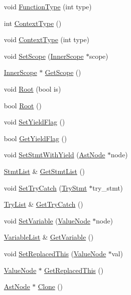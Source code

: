 \begin{DoxyCompactItemize}
\item 
void \hyperlink{classmocha_1_1_function_aeb8391e38eb2842ac1619522719c78af}{FunctionType} (int type)
\item 
int \hyperlink{classmocha_1_1_function_a2fa7ea873cb45ac4f02de44e3cbdf30b}{ContextType} ()
\item 
void \hyperlink{classmocha_1_1_function_af1f79f5424032a6ea0e2fd9b12f589ec}{ContextType} (int type)
\item 
void \hyperlink{classmocha_1_1_function_a9f5cfd13987ac0c4b6840801968afdc8}{SetScope} (\hyperlink{classmocha_1_1_inner_scope}{InnerScope} $\ast$scope)
\item 
\hyperlink{classmocha_1_1_inner_scope}{InnerScope} $\ast$ \hyperlink{classmocha_1_1_function_af8b7fbeeff670593b99208b4b160b50f}{GetScope} ()
\item 
void \hyperlink{classmocha_1_1_function_a4aaeba040456a899caf277cf25f7e236}{Root} (bool is)
\item 
bool \hyperlink{classmocha_1_1_function_abd3776ad2009b24328b3731c6d608ab3}{Root} ()
\item 
void \hyperlink{classmocha_1_1_function_ad71400eb14351910ac6d1c576413fc46}{SetYieldFlag} ()
\item 
bool \hyperlink{classmocha_1_1_function_ac56735e4aac25be688ac143f946aab02}{GetYieldFlag} ()
\item 
void \hyperlink{classmocha_1_1_function_a7262956db2bf8fa1d4e043709a3c0d13}{SetStmtWithYield} (\hyperlink{classmocha_1_1_ast_node}{AstNode} $\ast$node)
\item 
\hyperlink{classmocha_1_1_function_a5c4a48ede908b355b4f13a8f1d585707}{StmtList} \& \hyperlink{classmocha_1_1_function_a7761b50339b11f21c87e1ab52f6fa868}{GetStmtList} ()
\item 
void \hyperlink{classmocha_1_1_function_ad6b1cb328f7ea3d839377f86a03e7097}{SetTryCatch} (\hyperlink{classmocha_1_1_try_stmt}{TryStmt} $\ast$try\_\-stmt)
\item 
\hyperlink{classmocha_1_1_function_a9991b3d8362e4a8889c4b50d930d88ce}{TryList} \& \hyperlink{classmocha_1_1_function_a85f1491b11c7fc7a7d8d9aa7c7e9242f}{GetTryCatch} ()
\item 
void \hyperlink{classmocha_1_1_function_a9044326e0ef52a277c7131d986158ed9}{SetVariable} (\hyperlink{classmocha_1_1_value_node}{ValueNode} $\ast$node)
\item 
\hyperlink{classmocha_1_1_function_a243702678d29f0cfd91913838c1fb38c}{VariableList} \& \hyperlink{classmocha_1_1_function_ab7a1d37ca8f0d114b13b73f9efbc91b5}{GetVariable} ()
\item 
void \hyperlink{classmocha_1_1_function_a4b8c3561117a40bc804d224b29dd9b27}{SetReplacedThis} (\hyperlink{classmocha_1_1_value_node}{ValueNode} $\ast$val)
\item 
\hyperlink{classmocha_1_1_value_node}{ValueNode} $\ast$ \hyperlink{classmocha_1_1_function_a50b17dfecde9f7d484a7cc53094cdeb2}{GetReplacedThis} ()
\item 
\hyperlink{classmocha_1_1_ast_node}{AstNode} $\ast$ \hyperlink{classmocha_1_1_function_a787dcc9695496b521f0de87094003c7a}{Clone} ()
\end{DoxyCompactItemize}

